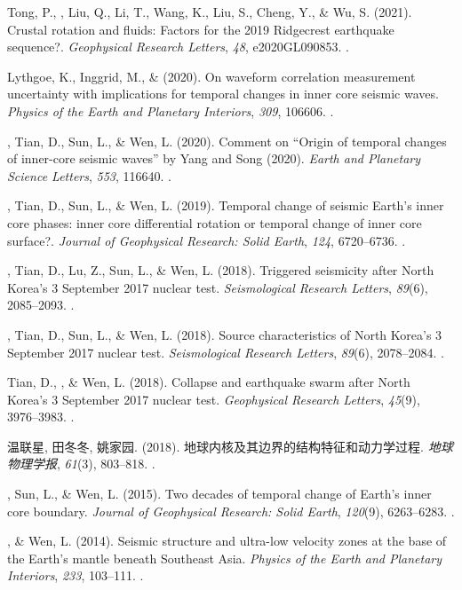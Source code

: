 \begin{etaremune}
    Tong, P., \Yao, Liu, Q., Li, T., Wang, K., Liu, S., Cheng, Y., \& Wu, S. (2021).
    Crustal rotation and fluids: Factors for the 2019 Ridgecrest earthquake sequence?.
    \textit{Geophysical Research Letters}, \textit{48}, e2020GL090853.
    .
\item
    Lythgoe, K., Inggrid, M., \& \Yao (2020).
    On waveform correlation measurement uncertainty with implications for temporal changes in inner core seismic waves.
    \textit{Physics of the Earth and Planetary Interiors}, \textit{309}, 106606.
    .
\item
    \Yao\CS, Tian, D., Sun, L., \& Wen, L. (2020).
    Comment on “Origin of temporal changes of inner-core seismic waves” by Yang and Song (2020).
    \textit{Earth and Planetary Science Letters}, \textit{553}, 116640.
    .
\item
    \Yao\CS, Tian, D., Sun, L., \& Wen, L. (2019).
    Temporal change of seismic Earth's inner core phases: inner core differential rotation or temporal change of inner core surface?.
    \textit{Journal of Geophysical Research: Solid Earth}, \textit{124}, 6720--6736.
    .
\item
    \Yao\CS, Tian, D., Lu, Z., Sun, L., \& Wen, L. (2018).
    Triggered seismicity after North Korea's 3 September 2017 nuclear test.
    \textit{Seismological Research Letters}, \textit{89}(6), 2085--2093.
    .
\item
    \Yao\CS, Tian, D., Sun, L., \& Wen, L. (2018).
	Source characteristics of North Korea's 3 September 2017 nuclear test.
    \textit{Seismological Research Letters}, \textit{89}(6), 2078--2084.
    .
\item
    Tian, D., \Yao\CF, \& Wen, L. (2018).
    Collapse and earthquake swarm after North Korea's 3 September 2017 nuclear test.
    \textit{Geophysical Research Letters}, \textit{45}(9), 3976--3983.
    .
\item
    温联星, 田冬冬, 姚家园. (2018).
    地球内核及其边界的结构特征和动力学过程.
    \textit{地球物理学报}, \textit{61}(3), 803--818.
    .
\item
    \Yao\CS, Sun, L., \& Wen, L. (2015).
    Two decades of temporal change of Earth's inner core boundary.
    \textit{Journal of Geophysical Research: Solid Earth}, \textit{120}(9), 6263--6283.
    .
\item
    \Yao\CS, \& Wen, L. (2014).
    Seismic structure and ultra-low velocity zones at the base of the Earth's mantle beneath Southeast Asia.
    \textit{Physics of the Earth and Planetary Interiors}, \textit{233}, 103--111.
    .
\end{etaremune}



